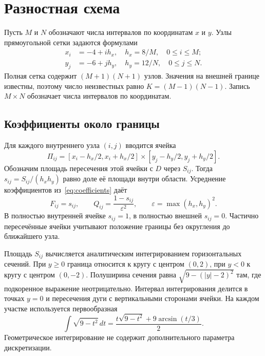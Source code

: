 \section{Разностная схема}

Пусть $M$ и $N$ обозначают числа интервалов по координатам $x$ и $y$.
Узлы прямоугольной сетки задаются формулами
\begin{equation}
    \begin{aligned}
        x_i & =-4+ih_x,\quad h_x=8/M,\quad 0\leq i\leq M;  \\
        y_j & =-6+jh_y,\quad h_y=12/N,\quad 0\leq j\leq N.
    \end{aligned}
\end{equation}
Полная сетка содержит $(M+1)(N+1)$ узлов.
Значения на внешней границе известны, поэтому число неизвестных равно $K=(M-1)(N-1)$.
Запись $M\times N$ обозначает числа интервалов по координатам.

\subsection{Коэффициенты около границы}

Для каждого внутреннего узла $(i,j)$ вводится ячейка
\begin{equation}
    \Pi_{ij}=[x_i-h_x/2,x_i+h_x/2]\times[y_j-h_y/2,y_j+h_y/2].
\end{equation}
Обозначим площадь пересечения этой ячейки с $D$ через $S_{ij}$.
Тогда $s_{ij}=S_{ij}/(h_xh_y)$ равно доле её площади внутри области.
Усреднение коэффициентов из~\eqref{eq:coefficients} даёт
\begin{equation}
    F_{ij}=s_{ij},\qquad Q_{ij}=\frac{1-s_{ij}}{\varepsilon^2}, \qquad \varepsilon=\max(h_x,h_y)^2.
    \label{eq:cellcoeff}
\end{equation}
В полностью внутренней ячейке $s_{ij}=1$, в полностью внешней $s_{ij}=0$.
Частично пересечённые ячейки учитывают положение границы без округления до ближайшего узла.

Площадь $S_{ij}$ вычисляется аналитическим интегрированием горизонтальных сечений.
При $y\geq0$ граница относится к кругу с центром $(0,2)$, при $y<0$ к кругу с центром $(0,-2)$.
Полуширина сечения равна $\sqrt{9-(|y|-2)^2}$ там, где подкоренное выражение неотрицательно.
Интервал интегрирования делится в точках $y=0$ и пересечения дуги с вертикальными сторонами ячейки.
На каждом участке используется первообразная
\begin{equation}
    \int\sqrt{9-t^2}\,dt
    =\frac{t\sqrt{9-t^2}+9\arcsin(t/3)}{2}.
\end{equation}
Геометрическое интегрирование не содержит дополнительного параметра дискретизации.

